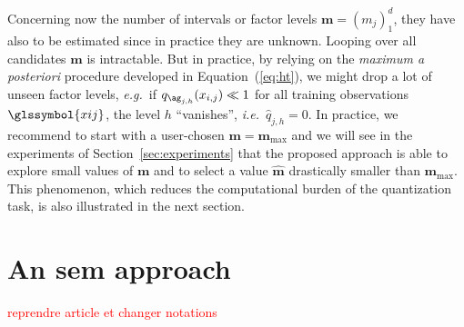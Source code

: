 Concerning now the number of intervals or factor levels $\boldsymbol{m} = (m_j)_1^d$, they have also to be estimated since in practice they are unknown. Looping over all candidates $\boldsymbol{m}$ is intractable. But in practice, by relying on the \textit{maximum a posteriori} procedure developed in Equation~(\ref{eq:ht}), we might drop a lot of unseen factor levels, \textit{e.g.}\ if $q_{\ag_{j,h}}(x_{i,j}) \ll 1$ for all training observations $\glssymbol{xij}$, the level $h$ ``vanishes'', \textit{i.e.}\ $\hat{q}_{j,h} = 0$. In practice, we recommend to start with a user-chosen $\bm{m}=\boldsymbol{m}_{\max}$ and we will see in the experiments of Section~\ref{sec:experiments} that the proposed approach is able to explore small values of $\boldsymbol{m}$ and to select a value $\hat{\boldsymbol{m}}$ drastically smaller than $\boldsymbol{m}_{\max}$. This phenomenon, which reduces the computational burden of the quantization task, is also illustrated in the next section.




\section{An \gls{sem} approach} \label{sec:sem}
 
 
 \textcolor{red}{reprendre article et changer notations}


